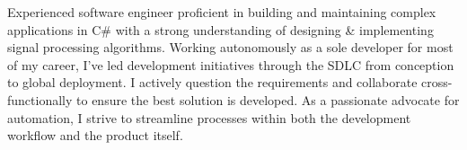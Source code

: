 \begin{justify}
Experienced software engineer proficient in building and maintaining complex applications in C\# with a strong understanding of designing \& implementing signal processing algorithms. Working autonomously as a sole developer for most of my career, I've led development initiatives through the SDLC from conception to global deployment. I actively question the requirements and collaborate cross-functionally to ensure the best solution is developed. As a passionate advocate for automation, I strive to streamline processes within both the development workflow and the product itself.
\end{justify}